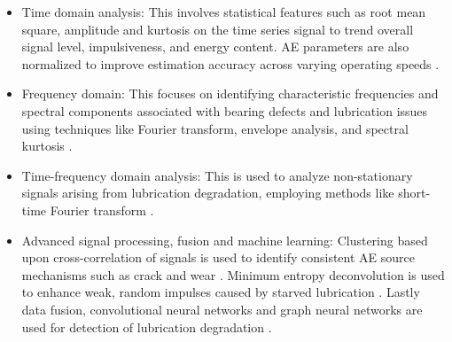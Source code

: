 \begin{itemize}
    \item Time domain analysis: This involves statistical features such as root mean square, amplitude and kurtosis on the time series signal to trend overall signal level, impulsiveness, and energy content. AE parameters are also normalized to improve estimation accuracy across varying operating speeds \cite{cornel_condition_2021} \cite{kestel_condition_2025} \cite{hou_-situ_2025} \cite{scheeren_acoustic_2024} \cite{wang_advanced_2024}.
    \item Frequency domain: This focuses on identifying characteristic frequencies and spectral components associated with bearing defects and lubrication issues using techniques like Fourier transform, envelope analysis, and spectral kurtosis \cite{zhang_graph-data-based_2024} \cite{kestel_condition_2025}.
    \item Time-frequency domain analysis: This is used to analyze non-stationary signals arising from lubrication degradation, employing methods like short-time Fourier transform \cite{kestel_condition_2025} \cite{scheeren_acoustic_2024} \cite{wang_advanced_2024}.
    \item Advanced signal processing, fusion and machine learning: Clustering based upon cross-correlation of signals is used to identify consistent AE source mechanisms such as crack and wear \cite{scheeren_acoustic_2024}. Minimum entropy deconvolution is used to enhance weak, random impulses caused by starved lubrication \cite{xu_vibration-based_2024}. Lastly data fusion, convolutional neural networks and graph neural networks are used for detection of lubrication degradation \cite{zhang_graph-data-based_2024} \cite{kestel_condition_2025} \cite{wang_advanced_2024}.
\end{itemize}

